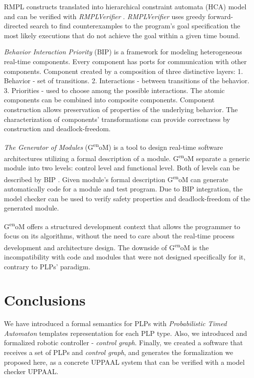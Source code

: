 \par RMPL constructs translated into hierarchical constraint automata (HCA) model and can be verified with \textit{RMPLVerifier} \cite{mahtab2004automated}. \textit{RMPLVerifier} uses greedy forward-directed search to find counterexamples to the program's goal specification the most likely executions that do not achieve the goal within a given time bound.
\par \textit{Behavior Interaction Priority} (BIP) \cite{basu2006modeling} is a framework for modeling heterogeneous real-time components. Every component has ports for communication with other components. Component created by a composition of three distinctive layers: 1. Behavior - set of transitions. 2. Interactions - between transitions of the behavior. 3. Priorities - used to choose among the possible interactions. The atomic components can be combined into composite components. Component construction allows preservation of properties of the underlying behavior. The characterization of components’ transformations can provide correctness by construction and deadlock-freedom.
\par \textit{The Generator of Modules} (G\textsuperscript{en}oM) \cite{Fleury97genom:a} is a tool to design real-time software architectures \cite{genome2012} utilizing a formal description of a module. G\textsuperscript{en}oM separate a generic module into two levels: control level and functional level. Both of levels can be described by BIP \cite{basu2008incremental}. Given module's formal description G\textsuperscript{en}oM can generate automatically code for a module and test program. Due to BIP integration, the model checker can be used to verify safety properties and deadlock-freedom of the generated module.
\par G\textsuperscript{en}oM offers a structured development context that allows the programmer to focus on its algorithms, without the need to care about the real-time process development and architecture design. The downside of G\textsuperscript{en}oM is the incompatibility with code and modules that were not designed specifically for it, contrary to PLPs' paradigm. \\
\chapter{Conclusions}
We have introduced a formal semantics for PLPs with \textit{Probabilistic Timed Automaton} templates representation for each PLP type. Also, we introduced and formalized robotic controller - \textit{control graph}. Finally, we created a software that receives a set of PLPs and \textit{control graph}, and generates the formalization we proposed here, as a concrete UPPAAL system that can be verified with a model checker UPPAAL. 